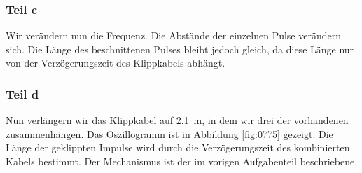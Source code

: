 \FloatBarrier
\subsubsection{Teil c}

Wir verändern nun die Frequenz. Die Abstände der einzelnen Pulse verändern
sich. Die Länge des beschnittenen Pulses bleibt jedoch gleich, da diese Länge
nur von der Verzögerungszeit des Klippkabels abhängt.

\FloatBarrier
\subsubsection{Teil d}

Nun verlängern wir das Klippkabel auf \SI{2.1}{\meter}, in dem wir drei der
vorhandenen zusammenhängen. Das Oszillogramm ist in Abbildung \ref{fig:0775}
gezeigt. Die Länge der geklippten Impulse wird durch die Verzögerungszeit des
kombinierten Kabels bestimmt. Der Mechanismus ist der im vorigen Aufgabenteil
beschriebene.

